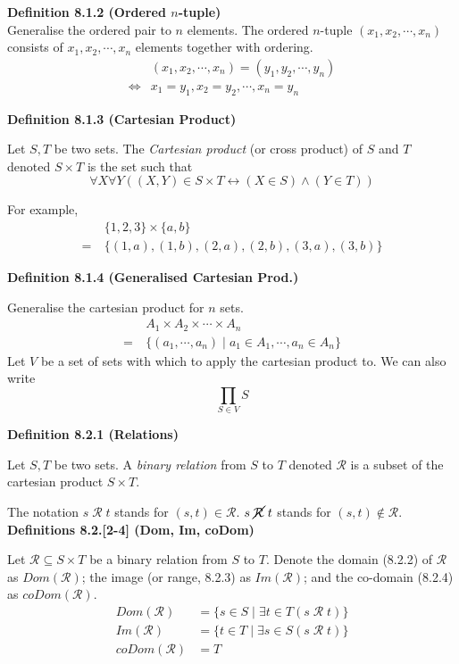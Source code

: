 \documentclass[a4paper]{article}
\newcommand{\subheading}[1]{{\scriptsize\textbf{#1}}}
\begin{document}
\begin{multicols*}{4}
\subheading{Definition 8.1.2 (Ordered $n$-tuple)} \\

Generalise the ordered pair to $n$ elements. The ordered $n$-tuple $(x_1, x_2,
\cdots, x_n)$ consists of $x_1, x_2, \cdots, x_n$ elements together with
ordering.
\begin{align*}
       &(x_1, x_2, \cdots, x_n) = (y_1, y_2, \cdots, y_n) \\
  \iff &x_1 = y_1, x_2 = y_2, \cdots, x_n = y_n
\end{align*}

\subheading{Definition 8.1.3 (Cartesian Product)}

Let $S, T$ be two sets. The \textit{Cartesian product} (or cross product) of $S$
and $T$ denoted $S \times T$ is the set such that
$$\forall X \forall Y ((X,Y) \in S \times T
  \longleftrightarrow (X \in S) \land (Y \in T))$$

For example,
\begin{align*}
    &\{1, 2, 3\} \times \{a, b\} \\
  =\ &\{(1, a), (1, b), (2, a), (2, b), (3, a), (3, b)\}
\end{align*}

\subheading{Definition 8.1.4 (Generalised Cartesian Prod.)}

Generalise the cartesian product for $n$ sets.
\begin{align*}
&A_1 \times A_2 \times \cdots \times A_n \\
  =\ &\{(a_1,\cdots,a_n)\;|\;a_1 \in A_1, \cdots, a_n \in A_n\}
\end{align*}
Let $V$ be a set of sets with which to apply the cartesian product to. We can
also write
$$\prod_{S \in V} S$$

\subheading{Definition 8.2.1 (Relations)}

Let $S, T$ be two sets. A \textit{binary relation} from $S$ to $T$ denoted
$\mathcal{R}$ is a subset of the cartesian product $S \times T$.

The notation $s\; \mathcal{R}\; t$ stands for $(s, t) \in \mathcal{R}$. $s\;
\cancel{\mathcal{R}}\; t$ stands for $(s, t) \not\in \mathcal{R}$.\\

\subheading{Definitions 8.2.[2-4] (Dom, Im, coDom)}

Let $\mathcal{R} \subseteq S \times T$ be a binary relation from $S$ to $T$.
Denote the domain (8.2.2) of $\mathcal{R}$ as $Dom(\mathcal{R})$; the image (or
range, 8.2.3) as $Im(\mathcal{R})$; and the co-domain (8.2.4) as
$coDom(\mathcal{R})$.
\begin{align*}
  Dom(\mathcal{R}) &= \{s \in S\;|\; \exists t \in T (s\;\mathcal{R}\;t)\} \\
  Im(\mathcal{R})  &= \{t \in T\;|\; \exists s \in S (s\;\mathcal{R}\;t)\} \\
  coDom(\mathcal{R}) &= T
\end{align*}


\end{multicols*}
\end{document}
